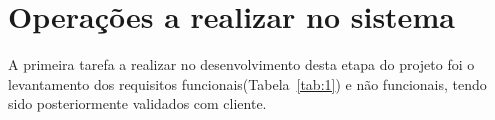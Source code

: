 \section{Operações a realizar no sistema}
A primeira tarefa a realizar no desenvolvimento desta etapa do projeto foi o levantamento dos requisitos funcionais(Tabela~\ref{tab:1}) e não funcionais, tendo sido posteriormente validados com cliente. 

